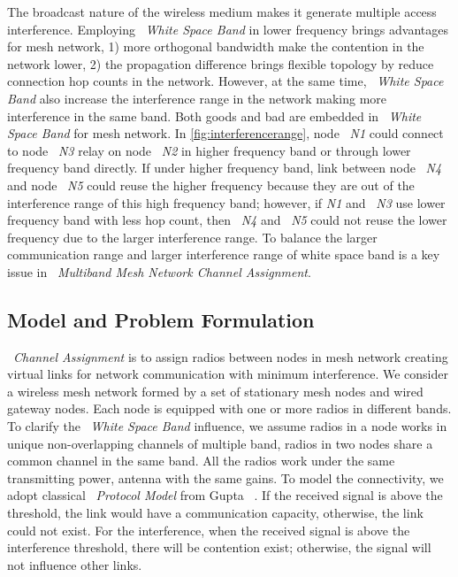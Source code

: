 The broadcast nature of the wireless medium makes it generate multiple access interference.
Employing ~\emph{White Space Band} in lower frequency brings advantages for mesh network, 1) more orthogonal bandwidth make the contention in the network lower,
 2) the propagation difference brings flexible topology by reduce connection hop counts in the network.
However, at the same time, ~\emph{White Space Band} also increase the interference range in the network making more interference in the same band. Both goods and bad are embedded in ~\emph{White Space Band} for mesh network.
In \ref{fig:interferencerange}, node ~\emph{N1} could connect to node ~\emph{N3} relay on node ~\emph{N2} in higher frequency band or through lower frequency band directly.
If under higher frequency band, link between node ~\emph{N4} and node ~\emph{N5} could reuse the higher frequency because they are out of the interference range of this high frequency band; however, if \emph{N1} and ~\emph{N3} use lower frequency band with less hop count, then ~\emph{N4} and ~\emph{N5} could not reuse the lower frequency due to the larger interference range.
To balance the larger communication range and larger interference range of white space band is a key issue in ~\emph{Multiband Mesh Network Channel Assignment}.

\subsection{Model and Problem Formulation}
\label{subsec:problem}

~\emph{Channel Assignment} is to assign radios between nodes in mesh network creating virtual links for network communication with minimum interference.
We consider a wireless mesh network formed by a set of stationary mesh nodes and wired gateway nodes. Each node is equipped with one or more radios in different bands. To clarify the ~\emph{White Space Band} influence, we assume radios in a node works in unique non-overlapping channels of multiple band, radios in two nodes share a common channel in the same band.
All the radios work under the same transmitting power, antenna with the same gains.
To model the connectivity, we adopt classical ~\emph{Protocol Model} from Gupta ~\cite{gupta2000capacity}. If the received signal is above the threshold, the link would have a communication capacity, otherwise, the link could not exist.
For the interference, when the received signal is above the interference threshold, there will be contention exist; otherwise, the signal will not influence other links.

